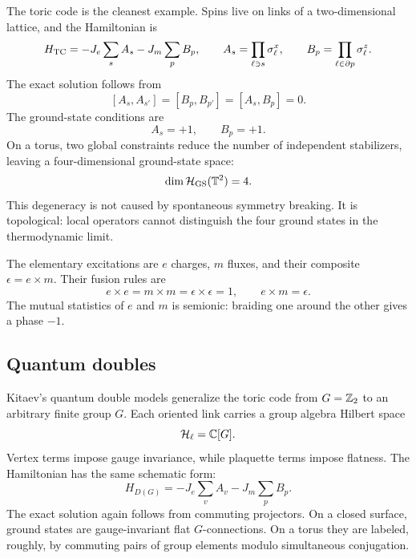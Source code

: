 The toric code is the cleanest example.  Spins live on links of a two-dimensional lattice, and the Hamiltonian is
\begin{equation}
\label{eq:conclusion-toric-code}
    H_{\rm TC}
    =
    -J_e\sum_s A_s
    -J_m\sum_p B_p,
    \qquad
    A_s=\prod_{\ell\ni s}\sigma_\ell^x,
    \qquad
    B_p=\prod_{\ell\in\partial p}\sigma_\ell^z .
\end{equation}
The exact solution follows from
\begin{equation}
\label{eq:conclusion-toric-commuting}
    [A_s,A_{s'}]=[B_p,B_{p'}]=[A_s,B_p]=0.
\end{equation}
The ground-state conditions are
\begin{equation}
\label{eq:conclusion-toric-ground-conditions}
    A_s=+1,
    \qquad
    B_p=+1.
\end{equation}
On a torus, two global constraints reduce the number of independent stabilizers, leaving a four-dimensional ground-state space:
\begin{equation}
\label{eq:conclusion-toric-degeneracy}
    \dim\mathcal{H}_{\rm GS}(\mathbb{T}^2)=4.
\end{equation}
This degeneracy is not caused by spontaneous symmetry breaking.  It is topological: local operators cannot distinguish the four ground states in the thermodynamic limit.

The elementary excitations are \(e\) charges, \(m\) fluxes, and their composite \(\epsilon=e\times m\).  Their fusion rules are
\begin{equation}
\label{eq:conclusion-toric-fusion}
    e\times e=m\times m=\epsilon\times\epsilon=1,
    \qquad
    e\times m=\epsilon.
\end{equation}
The mutual statistics of \(e\) and \(m\) is semionic: braiding one around the other gives a phase \(-1\).

\subsection{Quantum doubles}

Kitaev's quantum double models generalize the toric code from \(G=\mathbb{Z}_2\) to an arbitrary finite group \(G\).  Each oriented link carries a group algebra Hilbert space
\begin{equation}
\label{eq:conclusion-qdouble-link-hilbert}
    \mathcal{H}_\ell=\mathbb{C}[G].
\end{equation}
Vertex terms impose gauge invariance, while plaquette terms impose flatness.  The Hamiltonian has the same schematic form:
\begin{equation}
\label{eq:conclusion-quantum-double-hamiltonian}
    H_{D(G)}
    =
    -J_e\sum_v A_v
    -J_m\sum_p B_p .
\end{equation}
The exact solution again follows from commuting projectors.  On a closed surface, ground states are gauge-invariant flat \(G\)-connections.  On a torus they are labeled, roughly, by commuting pairs of group elements modulo simultaneous conjugation.

